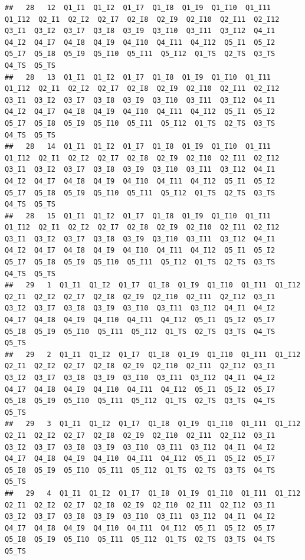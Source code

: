 \documentclass[
]{book}
\begin{document}
\begin{verbatim}
##   28   12  Q1_I1  Q1_I2  Q1_I7  Q1_I8  Q1_I9  Q1_I10  Q1_I11  Q1_I12  Q2_I1  Q2_I2  Q2_I7  Q2_I8  Q2_I9  Q2_I10  Q2_I11  Q2_I12  Q3_I1  Q3_I2  Q3_I7  Q3_I8  Q3_I9  Q3_I10  Q3_I11  Q3_I12  Q4_I1  Q4_I2  Q4_I7  Q4_I8  Q4_I9  Q4_I10  Q4_I11  Q4_I12  Q5_I1  Q5_I2  Q5_I7  Q5_I8  Q5_I9  Q5_I10  Q5_I11  Q5_I12  Q1_TS  Q2_TS  Q3_TS  Q4_TS  Q5_TS
##   28   13  Q1_I1  Q1_I2  Q1_I7  Q1_I8  Q1_I9  Q1_I10  Q1_I11  Q1_I12  Q2_I1  Q2_I2  Q2_I7  Q2_I8  Q2_I9  Q2_I10  Q2_I11  Q2_I12  Q3_I1  Q3_I2  Q3_I7  Q3_I8  Q3_I9  Q3_I10  Q3_I11  Q3_I12  Q4_I1  Q4_I2  Q4_I7  Q4_I8  Q4_I9  Q4_I10  Q4_I11  Q4_I12  Q5_I1  Q5_I2  Q5_I7  Q5_I8  Q5_I9  Q5_I10  Q5_I11  Q5_I12  Q1_TS  Q2_TS  Q3_TS  Q4_TS  Q5_TS
##   28   14  Q1_I1  Q1_I2  Q1_I7  Q1_I8  Q1_I9  Q1_I10  Q1_I11  Q1_I12  Q2_I1  Q2_I2  Q2_I7  Q2_I8  Q2_I9  Q2_I10  Q2_I11  Q2_I12  Q3_I1  Q3_I2  Q3_I7  Q3_I8  Q3_I9  Q3_I10  Q3_I11  Q3_I12  Q4_I1  Q4_I2  Q4_I7  Q4_I8  Q4_I9  Q4_I10  Q4_I11  Q4_I12  Q5_I1  Q5_I2  Q5_I7  Q5_I8  Q5_I9  Q5_I10  Q5_I11  Q5_I12  Q1_TS  Q2_TS  Q3_TS  Q4_TS  Q5_TS
##   28   15  Q1_I1  Q1_I2  Q1_I7  Q1_I8  Q1_I9  Q1_I10  Q1_I11  Q1_I12  Q2_I1  Q2_I2  Q2_I7  Q2_I8  Q2_I9  Q2_I10  Q2_I11  Q2_I12  Q3_I1  Q3_I2  Q3_I7  Q3_I8  Q3_I9  Q3_I10  Q3_I11  Q3_I12  Q4_I1  Q4_I2  Q4_I7  Q4_I8  Q4_I9  Q4_I10  Q4_I11  Q4_I12  Q5_I1  Q5_I2  Q5_I7  Q5_I8  Q5_I9  Q5_I10  Q5_I11  Q5_I12  Q1_TS  Q2_TS  Q3_TS  Q4_TS  Q5_TS
##   29   1  Q1_I1  Q1_I2  Q1_I7  Q1_I8  Q1_I9  Q1_I10  Q1_I11  Q1_I12  Q2_I1  Q2_I2  Q2_I7  Q2_I8  Q2_I9  Q2_I10  Q2_I11  Q2_I12  Q3_I1  Q3_I2  Q3_I7  Q3_I8  Q3_I9  Q3_I10  Q3_I11  Q3_I12  Q4_I1  Q4_I2  Q4_I7  Q4_I8  Q4_I9  Q4_I10  Q4_I11  Q4_I12  Q5_I1  Q5_I2  Q5_I7  Q5_I8  Q5_I9  Q5_I10  Q5_I11  Q5_I12  Q1_TS  Q2_TS  Q3_TS  Q4_TS  Q5_TS
##   29   2  Q1_I1  Q1_I2  Q1_I7  Q1_I8  Q1_I9  Q1_I10  Q1_I11  Q1_I12  Q2_I1  Q2_I2  Q2_I7  Q2_I8  Q2_I9  Q2_I10  Q2_I11  Q2_I12  Q3_I1  Q3_I2  Q3_I7  Q3_I8  Q3_I9  Q3_I10  Q3_I11  Q3_I12  Q4_I1  Q4_I2  Q4_I7  Q4_I8  Q4_I9  Q4_I10  Q4_I11  Q4_I12  Q5_I1  Q5_I2  Q5_I7  Q5_I8  Q5_I9  Q5_I10  Q5_I11  Q5_I12  Q1_TS  Q2_TS  Q3_TS  Q4_TS  Q5_TS
##   29   3  Q1_I1  Q1_I2  Q1_I7  Q1_I8  Q1_I9  Q1_I10  Q1_I11  Q1_I12  Q2_I1  Q2_I2  Q2_I7  Q2_I8  Q2_I9  Q2_I10  Q2_I11  Q2_I12  Q3_I1  Q3_I2  Q3_I7  Q3_I8  Q3_I9  Q3_I10  Q3_I11  Q3_I12  Q4_I1  Q4_I2  Q4_I7  Q4_I8  Q4_I9  Q4_I10  Q4_I11  Q4_I12  Q5_I1  Q5_I2  Q5_I7  Q5_I8  Q5_I9  Q5_I10  Q5_I11  Q5_I12  Q1_TS  Q2_TS  Q3_TS  Q4_TS  Q5_TS
##   29   4  Q1_I1  Q1_I2  Q1_I7  Q1_I8  Q1_I9  Q1_I10  Q1_I11  Q1_I12  Q2_I1  Q2_I2  Q2_I7  Q2_I8  Q2_I9  Q2_I10  Q2_I11  Q2_I12  Q3_I1  Q3_I2  Q3_I7  Q3_I8  Q3_I9  Q3_I10  Q3_I11  Q3_I12  Q4_I1  Q4_I2  Q4_I7  Q4_I8  Q4_I9  Q4_I10  Q4_I11  Q4_I12  Q5_I1  Q5_I2  Q5_I7  Q5_I8  Q5_I9  Q5_I10  Q5_I11  Q5_I12  Q1_TS  Q2_TS  Q3_TS  Q4_TS  Q5_TS

\end{verbatim}
\end{document}
